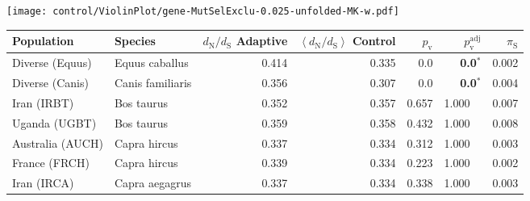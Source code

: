 \begin{center}
\begin{adjustbox}{width = 1\textwidth}
\begin{tabular}{|l|l|r|r|r|r|r|r|}
\bottomrule
\end{tabular}
\end{adjustbox}
\newpage
\texttt{[image: control/ViolinPlot/gene-MutSelExclu-0.025-unfolded-MK-w.pdf]} 
\begin{adjustbox}{width = 1\textwidth}
\begin{tabular}{|l|l|r|r|r|r|r|}
\toprule
                     Population &              Species & \specialcell{$d_{\mathrm{N}} / d_{\mathrm{S}}$ \\ Adaptive} & \specialcell{$\left< d_{\mathrm{N}} / d_{\mathrm{S}} \right>$ \\ Control} & $p_{\mathrm{v}}$ & $p_{\mathrm{v}}^{\mathrm{adj}}$ & $\pi_{\textrm{S}}$ \\
\midrule
                Diverse (Equus) &       Equus caballus &                                              0.414 &                                              0.335 &              0.0 &                    \textbf{0.0}$\bm{^*}$ &              0.002 \\
                Diverse (Canis) &     Canis familiaris &                                              0.356 &                                              0.307 &              0.0 &                    \textbf{0.0}$\bm{^*}$ &              0.004 \\
                    Iran (IRBT) &           Bos taurus &                                              0.352 &                                              0.357 &            0.657 &                         1.000~~ &              0.007 \\
                  Uganda (UGBT) &           Bos taurus &                                              0.359 &                                              0.358 &            0.432 &                         1.000~~ &              0.008 \\
               Australia (AUCH) &         Capra hircus &                                              0.337 &                                              0.334 &            0.312 &                         1.000~~ &              0.003 \\
                  France (FRCH) &         Capra hircus &                                              0.339 &                                              0.334 &            0.223 &                         1.000~~ &              0.002 \\
                    Iran (IRCA) &       Capra aegagrus &                                              0.337 &                                              0.334 &            0.338 &                         1.000~~ &              0.003 \\

\end{tabular}
\end{adjustbox}
\end{center}
